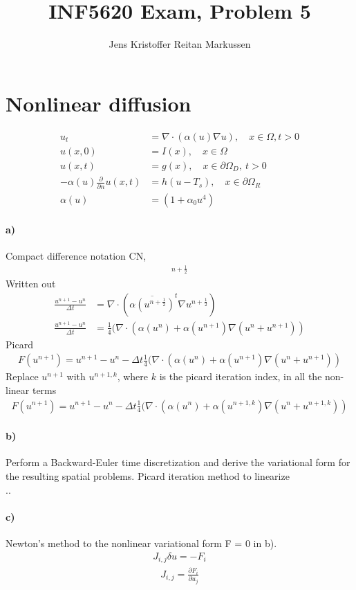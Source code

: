 \documentclass[11pt,a4paper]{article}
\author{Jens Kristoffer Reitan Markussen}
\title{INF5620 Exam, Problem 5}
\begin{document}
\maketitle
\section*{Nonlinear diffusion}
\begin{align}
u_t &= \nabla\cdot (\alpha(u)\nabla u),\quad x\in\Omega,
t >0\\
u(x,0) &= I(x),\quad x\in\Omega\\
u(x,t) &= g(x),\quad x\in\partial\Omega_D,\ t>0\\
-\alpha(u)\frac{\partial}{\partial n} u(x, t) &= h(u - T_s),\quad
x\in\partial\Omega_R \\
\alpha(u) &= (1+\alpha_0u^4)
\end{align}
\paragraph*{a)}
Compact difference notation CN,
\begin{align}
[D_tu = \nabla \cdot (\overline{\alpha(u)}^t\nabla u)]^{n+\frac{1}{2}}
\end{align}
Written out
\begin{align}
\frac{u^{n+1}-u^n}{\Delta t} &=  \nabla \cdot (\overline{\alpha(u^{n+\frac{1}{2}})}^t\nabla u^{n+\frac{1}{2}})\\
\frac{u^{n+1}-u^n}{\Delta t} &=  \frac{1}{4}(\nabla \cdot (\alpha(u^n)+\alpha(u^{n+1})\nabla(u^n+u^{n+1}))
\end{align}
Picard
\begin{align}
F(u^{n+1}) = u^{n+1}-u^n - \Delta t\frac{1}{4}(\nabla \cdot (\alpha(u^n)+\alpha(u^{n+1})\nabla(u^n+u^{n+1}))
\end{align}
Replace $u^{n+1}$ with $u^{n+1,k}$, where $k$ is the picard iteration index, in all the non-linear terms
\begin{align}
F(u^{n+1}) = u^{n+1}-u^n - \Delta t\frac{1}{4}(\nabla \cdot (\alpha(u^n)+\alpha(u^{n+1,k})\nabla(u^n+u^{n+1,k}))
\end{align}
\paragraph*{b)}
Perform a Backward-Euler time discretization and derive the variational form for the resulting spatial problems. Picard iteration method to linearize \\

..

\paragraph*{c)}
Newton’s method to the nonlinear variational form F = 0 in b).
\begin{align}
J_{i,j} \delta u = -F_i 
\end{align}
\begin{align*}
J_{i,j} = \frac{\partial F_i}{\partial u_j}
\end{align*}
\end{document}
